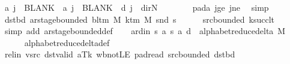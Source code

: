\begin{isabellebody}
\ {\isachardoublequoteopen}{\isacharquery}{\kern0pt}a\ j\ {\isacharequal}{\kern0pt}\ BLANK{}\ {\isasymand}\ {\isacharquery}{\kern0pt}a{\isacharprime}{\kern0pt}\ j\ {\isacharequal}{\kern0pt}\ BLANK{}\ {\isasymand}\ {\isacharquery}{\kern0pt}d\ j\ {\isacharequal}{\kern0pt}\ dir{\isachardot}{\kern0pt}N{\isachardoublequoteclose}\isanewline
\ \ \ \ \ \ \isamarkupfalse%
\ pad{\isacharunderscore}{\kern0pt}a\ jge\ jne\ \isamarkupfalse%
\ simp\isanewline
\ \ \isamarkupfalse%
\isanewline
\ \ \isamarkupfalse%
\ dst{\isacharunderscore}{\kern0pt}bd{\isacharcolon}{\kern0pt}\ {\isachardoublequoteopen}ar{\isacharunderscore}{\kern0pt}stage{\isacharunderscore}{\kern0pt}bounded\ {\isacharparenleft}{\kern0pt}bl{\isacharunderscore}{\kern0pt}tm\ M{\isacharparenright}{\kern0pt}\ {\isacharparenleft}{\kern0pt}k{\isacharunderscore}{\kern0pt}tm\ M{\isacharparenright}{\kern0pt}\ {\isacharparenleft}{\kern0pt}snd\ {\isacharquery}{\kern0pt}s{\isacharprime}{\kern0pt}{\isacharparenright}{\kern0pt}{\isachardoublequoteclose}\isanewline
\ \ \ \ \isamarkupfalse%
\ src{\isacharunderscore}{\kern0pt}bounded\ ksucc{\isacharunderscore}{\kern0pt}lt\ \isamarkupfalse%
\ {\isacharparenleft}{\kern0pt}simp\ add{\isacharcolon}{\kern0pt}\ ar{\isacharunderscore}{\kern0pt}stage{\isacharunderscore}{\kern0pt}bounded{\isacharunderscore}{\kern0pt}def{\isacharparenright}{\kern0pt}\isanewline
\ \ \isamarkupfalse%
\ ard{\isacharunderscore}{\kern0pt}in{\isacharcolon}{\kern0pt}\ {\isachardoublequoteopen}{\isacharparenleft}{\kern0pt}{\isacharquery}{\kern0pt}s{\isacharcomma}{\kern0pt}\ {\isacharquery}{\kern0pt}a{\isacharcomma}{\kern0pt}\ {\isacharquery}{\kern0pt}s{\isacharprime}{\kern0pt}{\isacharcomma}{\kern0pt}\ {\isacharquery}{\kern0pt}a{\isacharprime}{\kern0pt}{\isacharcomma}{\kern0pt}\ {\isacharquery}{\kern0pt}d{\isacharparenright}{\kern0pt}\ {\isasymin}\ alphabet{\isacharunderscore}{\kern0pt}reduce{\isacharunderscore}{\kern0pt}delta\ M{\isachardoublequoteclose}\isanewline
\ \ \ \ \isamarkupfalse%
\ alphabet{\isacharunderscore}{\kern0pt}reduce{\isacharunderscore}{\kern0pt}delta{\isacharunderscore}{\kern0pt}def\isanewline
\ \ \ \ \isamarkupfalse%
\ rel{\isacharunderscore}{\kern0pt}in\ vsrc\ dst{\isacharunderscore}{\kern0pt}valid\ aTk\ wb{\isacharunderscore}{\kern0pt}not{\isacharunderscore}{\kern0pt}LE\ pad{\isacharunderscore}{\kern0pt}read\ src{\isacharunderscore}{\kern0pt}bounded\ dst{\isacharunderscore}{\kern0pt}bd\isanewline

\end{isabellebody}
